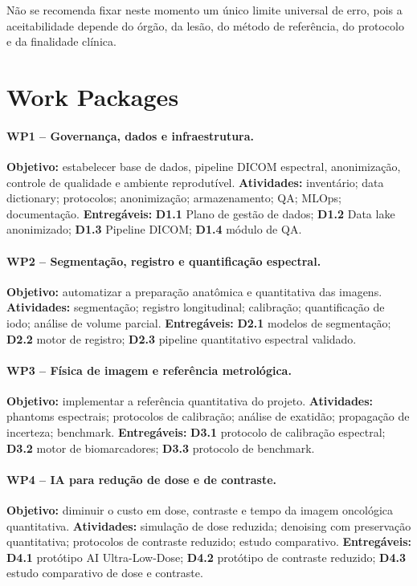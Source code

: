 \documentclass[11pt,a4paper]{article}
\begin{document}
Não se recomenda fixar neste momento um único limite universal de erro, pois a aceitabilidade depende do órgão, da lesão, do método de referência, do protocolo e da finalidade clínica.

\section{Work Packages}

\paragraph{WP1 -- Governança, dados e infraestrutura.}
\textbf{Objetivo:} estabelecer base de dados, pipeline DICOM espectral, anonimização, controle de qualidade e ambiente reprodutível.
\textbf{Atividades:} inventário; data dictionary; protocolos; anonimização; armazenamento; QA; MLOps; documentação.
\textbf{Entregáveis:} \textbf{D1.1} Plano de gestão de dados; \textbf{D1.2} Data lake anonimizado; \textbf{D1.3} Pipeline DICOM; \textbf{D1.4} módulo de QA.

\paragraph{WP2 -- Segmentação, registro e quantificação espectral.}
\textbf{Objetivo:} automatizar a preparação anatômica e quantitativa das imagens.
\textbf{Atividades:} segmentação; registro longitudinal; calibração; quantificação de iodo; análise de volume parcial.
\textbf{Entregáveis:} \textbf{D2.1} modelos de segmentação; \textbf{D2.2} motor de registro; \textbf{D2.3} pipeline quantitativo espectral validado.

\paragraph{WP3 -- Física de imagem e referência metrológica.}
\textbf{Objetivo:} implementar a referência quantitativa do projeto.
\textbf{Atividades:} phantoms espectrais; protocolos de calibração; análise de exatidão; propagação de incerteza; benchmark.
\textbf{Entregáveis:} \textbf{D3.1} protocolo de calibração espectral; \textbf{D3.2} motor de biomarcadores; \textbf{D3.3} protocolo de benchmark.

\paragraph{WP4 -- IA para redução de dose e de contraste.}
\textbf{Objetivo:} diminuir o custo em dose, contraste e tempo da imagem oncológica quantitativa.
\textbf{Atividades:} simulação de dose reduzida; denoising com preservação quantitativa; protocolos de contraste reduzido; estudo comparativo.
\textbf{Entregáveis:} \textbf{D4.1} protótipo AI Ultra-Low-Dose; \textbf{D4.2} protótipo de contraste reduzido; \textbf{D4.3} estudo comparativo de dose e contraste.
\end{document}
